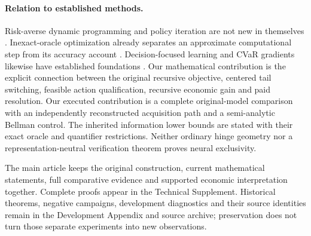 \paragraph{Relation to established methods.}
Risk-averse dynamic programming and policy iteration are not new in themselves \citep{ruszczynski2010risk,ruszczynski2014erratum}. Inexact-oracle optimization already separates an approximate computational step from its accuracy account \citep{DevolderGlineurNesterov2014}. Decision-focused learning and CVaR gradients likewise have established foundations \citep{ElmachtoubGrigas2022,Tamar2015}. Our mathematical contribution is the explicit connection between the original recursive objective, centered tail switching, feasible action qualification, recursive economic gain and paid resolution. Our executed contribution is a complete original-model comparison with an independently reconstructed acquisition path and a semi-analytic Bellman control. The inherited information lower bounds are stated with their exact oracle and quantifier restrictions. Neither ordinary hinge geometry nor a representation-neutral verification theorem proves neural exclusivity.

The main article keeps the original construction, current mathematical statements, full comparative evidence and supported economic interpretation together. Complete proofs appear in the Technical Supplement. Historical theorems, negative campaigns, development diagnostics and their source identities remain in the Development Appendix and source archive; preservation does not turn those separate experiments into new observations.
